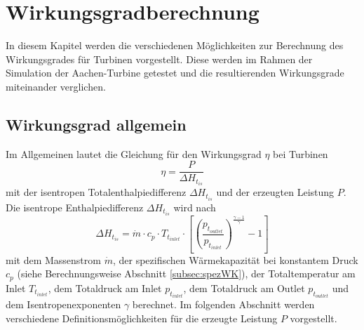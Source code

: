 \section{Wirkungsgradberechnung}
\label{cha:wgberechnung}
In diesem Kapitel werden die verschiedenen Möglichkeiten zur Berechnung des Wirkungsgrades für Turbinen vorgestellt. Diese werden im Rahmen der Simulation der Aachen-Turbine getestet und die resultierenden Wirkungsgrade miteinander verglichen.
\subsection{Wirkungsgrad allgemein}
Im Allgemeinen lautet die Gleichung für den Wirkungsgrad $\eta$ bei Turbinen 
\begin{equation}
\label{eq:wgallgemein}
\eta =\frac{P}{\Delta H_{t_{is}}}
\end{equation}
mit der isentropen Totalenthalpiedifferenz $\Delta H_{t_{is}}$ und der erzeugten Leistung $P$.
Die isentrope Enthalpiedifferenz $\Delta H_{t_{is}}$ wird nach
\begin{equation}
\label{eq:wgnenner}
\Delta H_{t_{is}} = \dot m \cdot c_p \cdot T_{t_{inlet}} \cdot \left[ \left( \frac{p_{t_{outlet}}}{p_{t_{inlet}}}\right)^\frac{\gamma-1}{\gamma}-1\right]
\end{equation}
mit dem Massenstrom $\dot m$, der spezifischen Wärmekapazität bei konstantem Druck $c_p$ (siehe Berechnungsweise Abschnitt \ref{subsec:spezWK}), der Totaltemperatur am Inlet $T_{t_{inlet}}$, dem Totaldruck am Inlet $p_{t_{inlet}}$, dem Totaldruck am Outlet $p_{t_{outlet}}$ und dem Isentropenexponenten $\gamma$ berechnet.\newline 
Im folgenden Abschnitt werden verschiedene Definitionsmöglichkeiten für die erzeugte Leistung $P$ vorgestellt.
